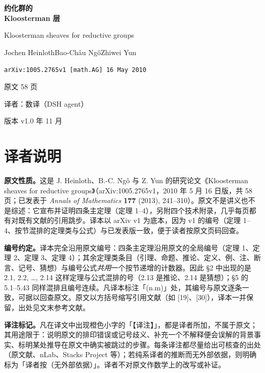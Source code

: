 \documentclass[UTF8,a4paper,12pt,fontset=fandol,scheme=chinese]{ctexart}
\begin{document}
\begin{titlepage}
\centering
\vspace*{2.2cm}
{\Huge\bfseries 约化群的\\[0.35em] Kloosterman 层\par}
\vspace{1.0cm}
{\Large Kloosterman sheaves for reductive groups\par}
\vspace{1.6cm}
{\large Jochen Heinloth\quad Bao-Ch\^au Ng\^o\quad Zhiwei Yun\par}
\vspace{0.6cm}
{\normalsize \texttt{arXiv:1005.2765v1 [math.AG] 16 May 2010}\par}
\vspace{0.4cm}
{\normalsize 原文 58 页\par}
\vfill
{\large 译者：数译（DSH agent）\par}
\vspace{0.3cm}
{\large 版本 v1.0 年 11 月\par}
\vspace{1.2cm}
\end{titlepage}

\section*{译者说明}

\textbf{原文性质。}这是 J. Heinloth、B.-C. Ng\^o 与 Z. Yun 的研究论文《Kloosterman sheaves for reductive groups》（arXiv:1005.2765v1，2010 年 5 月 16 日版，共 58 页；已发表于 \emph{Annals of Mathematics} \textbf{177} (2013), 241--310）。原文不是讲义也不是综述：它宣布并证明四条主定理（定理 1--4），另附四个技术附录，几乎每页都有对既有文献的引用跳步。译本以 arXiv v1 为底本，因为 v1 的编号（定理 1--4、按节混排的定理类与公式）与已发表版一致，便于读者按原文页码回查。

\textbf{编号约定。}译本完全沿用原文编号：四条主定理沿用原文的全局编号（定理 1、定理 2、定理 3、定理 4）；其余定理类条目（引理、命题、推论、定义、例、注、断言、记号、猜想）与编号公式\emph{共用}一个按节递增的计数器。因此 §2 中出现的是 2.1, 2.2, \dots, 2.14 这样定理与公式混排的号（2.13 是推论、2.14 是猜想）；§5 的 5.1--5.43 同样混排且编号连续。凡译本标注「(n.m)」处，其编号与原文逐条一致，可据以回查原文。原文以方括号缩写引用文献（如 [19]、[30]），译本一并保留，出处见文末参考文献。

\textbf{译注标记。}凡在译文中出现橙色小字的「【译注】」，都是译者所加，不属于原文；其用途限于：说明原文的排印错误或记号歧义、补充一个不解释便会误解的背景事实、标明某处推导在原文中确实被跳过的步骤。每条译注都尽量给出可核查的出处（原文献、nLab、Stacks Project 等）；若纯系译者的推断而无外部依据，则明确标为「译者按（无外部依据）」。译者不对原文作数学上的改写或补证。
\end{document}
